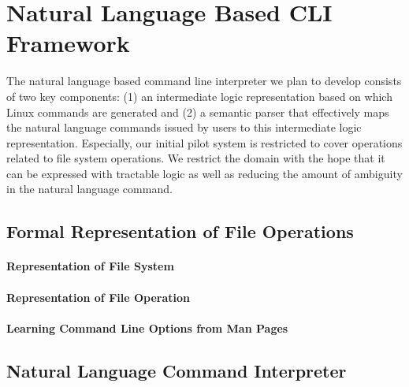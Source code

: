 \section{Natural Language Based CLI Framework}

The natural language based command line interpreter we plan to develop consists of two key components: (1) an intermediate logic representation based on which Linux commands are generated and (2) a semantic parser that effectively maps the natural language commands issued by users to this intermediate logic representation. Especially, our initial pilot system is restricted to cover operations related to file system operations. We restrict the domain with the hope that it can be expressed with tractable logic as well as reducing the amount of ambiguity in the natural language command.

\subsection{Formal Representation of File Operations}
\paragraph{Representation of File System}
\paragraph{Representation of File Operation}
\paragraph{Learning Command Line Options from Man Pages}

\subsection{Natural Language Command Interpreter}